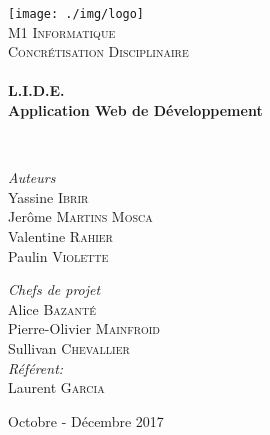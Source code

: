 \begin{titlepage}
\begin{center}

\texttt{[image: ./img/logo]}~\\[1cm]

\textsc{\LARGE M1 Informatique}\\[1.5cm]

\textsc{\Large Concrétisation Disciplinaire}\\[0.5cm]

\HRule \\[0.4cm]

{\huge \bfseries L.I.D.E.\\
Application Web de Développement \\[0.4cm] }

\HRule \\[1.5cm]

\begin{minipage}{0.4\textwidth}
\begin{flushleft} \large
\emph{Auteurs}\\
Yassine \textsc{Ibrir}\\
Jerôme \textsc{Martins Mosca}\\
Valentine \textsc{Rahier}\\
Paulin \textsc{Violette}\\
\end{flushleft}
\end{minipage}
\begin{minipage}{0.4\textwidth}
\begin{flushright} \large
\emph{Chefs de projet}\\
Alice \textsc{Bazanté}\\
Pierre-Olivier \textsc{Mainfroid}\\
Sullivan \textsc{Chevallier}\\
\emph{Référent:} \\
Laurent \textsc{Garcia}
\end{flushright}
\end{minipage}

\vfill

{\large Octobre - Décembre 2017}

\end{center}
\end{titlepage}